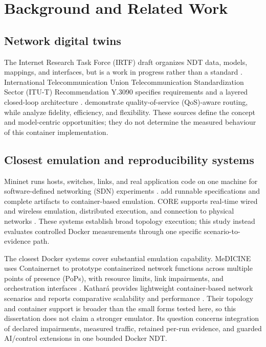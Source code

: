 \section{Background and Related Work}
\label{sec:related-work}

\subsection{Network digital twins}

The Internet Research Task Force (IRTF) draft organizes NDT data, models, mappings, and interfaces, but is a work in progress rather than a standard \citep{zhou2026ndt}. International Telecommunication Union Telecommunication Standardization Sector (ITU-T) Recommendation Y.3090 specifies requirements and a layered closed-loop architecture \citep{itut2022y3090}. \citet{almasan2022ndt} demonstrate quality-of-service (QoS)-aware routing, while \citet{hui2023digitaltwin} analyze fidelity, efficiency, and flexibility. These sources define the concept and model-centric opportunities; they do not determine the measured behaviour of this container implementation.

\subsection{Closest emulation and reproducibility systems}

Mininet runs hosts, switches, links, and real application code on one machine for software-defined networking (SDN) experiments \citep{lantz2010network}. \citet{handigol2012reproducible} add runnable specifications and complete artifacts to container-based emulation. CORE supports real-time wired and wireless emulation, distributed execution, and connection to physical networks \citep{ahrenholz2008core}. These systems establish broad topology execution; this study instead evaluates controlled Docker measurements through one specific scenario-to-evidence path.

The closest Docker systems cover substantial emulation capability. MeDICINE uses Containernet to prototype containerized network functions across multiple points of presence (PoPs), with resource limits, link impairments, and orchestration interfaces \citep{peuster2016medicine}. Kathar\'a provides lightweight container-based network scenarios and reports comparative scalability and performance \citep{scazzariello2020kathara}. Their topology and container support is broader than the small forms tested here, so this dissertation does not claim a stronger emulator. Its question concerns integration of declared impairments, measured traffic, retained per-run evidence, and guarded AI/control extensions in one bounded Docker NDT.

